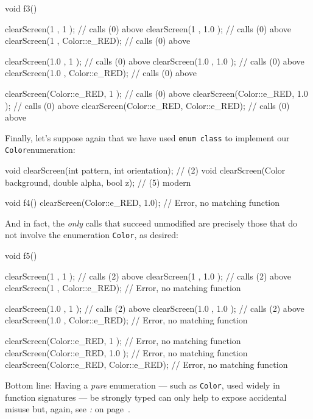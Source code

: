 \begin{emcppslisting}
void f3()
{
    clearScreen(1           , 1           );  // calls (0) above
    clearScreen(1           , 1.0         );  // calls (0) above
    clearScreen(1           , Color::e_RED);  // calls (0) above

    clearScreen(1.0         , 1           );  // calls (0) above
    clearScreen(1.0         , 1.0         );  // calls (0) above
    clearScreen(1.0         , Color::e_RED);  // calls (0) above

    clearScreen(Color::e_RED, 1           );  // calls (0) above
    clearScreen(Color::e_RED, 1.0         );  // calls (0) above
    clearScreen(Color::e_RED, Color::e_RED);  // calls (0) above
}
\end{emcppslisting}

\noindent Finally, let's suppose again that we have used
\texttt{enum}~\texttt{class} to implement our \texttt{Color}\linebreak[4]
\mbox{enumeration}:

\begin{emcppslisting}
void clearScreen(int pattern, int orientation);            // (2)
void clearScreen(Color background, double alpha, bool z);  // (5) modern

void f4()
{
    clearScreen(Color::e_RED, 1.0);  // Error, no matching function
}
\end{emcppslisting}

\noindent And in fact, the \emph{only} calls that succeed unmodified are precisely
those that do not involve the enumeration \texttt{Color}, as desired:

\begin{emcppslisting}
void f5()
{
    clearScreen(1           , 1           );  // calls (2) above
    clearScreen(1           , 1.0         );  // calls (2) above
    clearScreen(1           , Color::e_RED);  // Error, no matching function

    clearScreen(1.0         , 1           );  // calls (2) above
    clearScreen(1.0         , 1.0         );  // calls (2) above
    clearScreen(1.0         , Color::e_RED);  // Error, no matching function

    clearScreen(Color::e_RED, 1           );  // Error, no matching function
    clearScreen(Color::e_RED, 1.0         );  // Error, no matching function
    clearScreen(Color::e_RED, Color::e_RED);  // Error, no matching function
}
\end{emcppslisting}

\noindent Bottom line: Having a \emph{pure} enumeration --- such as
\texttt{Color}, used widely in function signatures --- be strongly typed
can only help to expose accidental misuse but, again, see
\textit{: } on page~\pageref{strong-typing-of-an-enum-class-can-be-counterproductive}.

